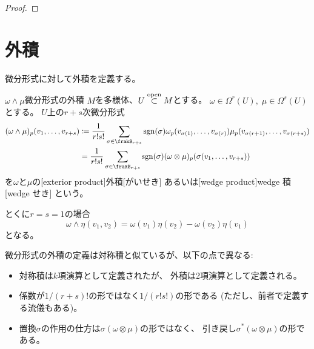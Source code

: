 \documentclass[report]{jlreq}
\begin{document}
\begin{proof}
    \TODO{}
\end{proof}

%
\section{外積}

微分形式に対して外積を定義する。

\begin{definition}[微分形式の外積]
        {$\omega \wedge \mu$}{微分形式の外積}
    $M$を多様体、$U \stackrel{\text{open}}{\subset} M$とする。
    $\omega \in \Omega^r(U), \; \mu \in \Omega^s(U)$とする。
    $U$上の$r + s$次微分形式
    \begin{alignat}{1}
        (\omega \wedge \mu)_p (v_1, \dots, v_{r + s})
            &\coloneqq \frac{1}{r! s!}
            \sum_{\sigma \in \frakS_{r + s}}
            \sgn(\sigma)
            \omega_p(v_{\sigma(1)}, \dots, v_{\sigma(r)})
            \mu_p(v_{\sigma(r + 1)}, \dots, v_{\sigma(r + s)}) \\
            &= \frac{1}{r! s!}
            \sum_{\sigma \in \frakS_{r + s}}
            \sgn(\sigma)
            (\omega \otimes \mu)_p
            (\sigma(v_1, \dots, v_{r + s}))
    \end{alignat}
    を$\omega$と$\mu$の[exterior product]{外積}[がいせき]
    あるいは[wedge product]{wedge 積}[wedge せき]
    という。
\end{definition}

\begin{remark}
    とくに$r = s = 1$の場合
    \begin{equation}
        \omega \wedge \eta (v_1, v_2)
            = \omega(v_1) \eta(v_2) - \omega(v_2) \eta(v_1)
    \end{equation}
    となる。
\end{remark}

\begin{remark}
    微分形式の外積の定義は対称積と似ているが、以下の点で異なる:
    \begin{itemize}
        \item 対称積は$k$項演算として定義されたが、
            外積は2項演算として定義される。
        \item 係数が$1 / (r + s)!$の形ではなく$1 / (r! s!)$の形である
            (ただし、前者で定義する流儀もある)。
        \item 置換$\sigma$の作用の仕方は$\sigma(\omega \otimes \mu)$の形ではなく、
            引き戻し$\sigma^* (\omega \otimes \mu)$の形である。
    \end{itemize}
\end{remark}
\end{document}
